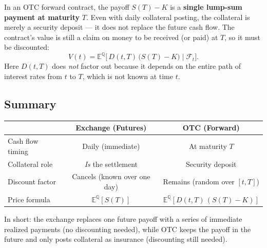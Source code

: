 \documentclass[12pt]{article}
\begin{document}
In an OTC forward contract, the payoff $S(T) - K$ is a \textbf{single lump-sum payment at maturity} $T$. Even with daily collateral posting, the collateral is merely a security deposit --- it does not replace the future cash flow. The contract's value is still a claim on money to be received (or paid) at $T$, so it must be discounted:
\[
V(t) = \mathbb{E}^{\mathbb{Q}}\!\Big[\,D(t, T)\,\big(S(T) - K\big)\;\Big|\;\mathcal{F}_t\Big].
\]
Here $D(t,T)$ does \emph{not} factor out because it depends on the entire path of interest rates from $t$ to $T$, which is not known at time $t$.

\subsection*{Summary}

\begin{center}
\begin{tabular}{lcc}
\hline
& \textbf{Exchange (Futures)} & \textbf{OTC (Forward)} \\
\hline
Cash flow timing & Daily (immediate) & At maturity $T$ \\
Collateral role & \emph{Is} the settlement & Security deposit \\
Discount factor & Cancels (known over one day) & Remains (random over $[t, T]$) \\
Price formula & $\mathbb{E}^{\mathbb{Q}}[S(T)]$ & $\mathbb{E}^{\mathbb{Q}}[D(t,T)\,(S(T)-K)]$ \\
\hline
\end{tabular}
\end{center}

In short: the exchange replaces one future payoff with a series of immediate realized payments (no discounting needed), while OTC keeps the payoff in the future and only posts collateral as insurance (discounting still needed).
\end{document}

